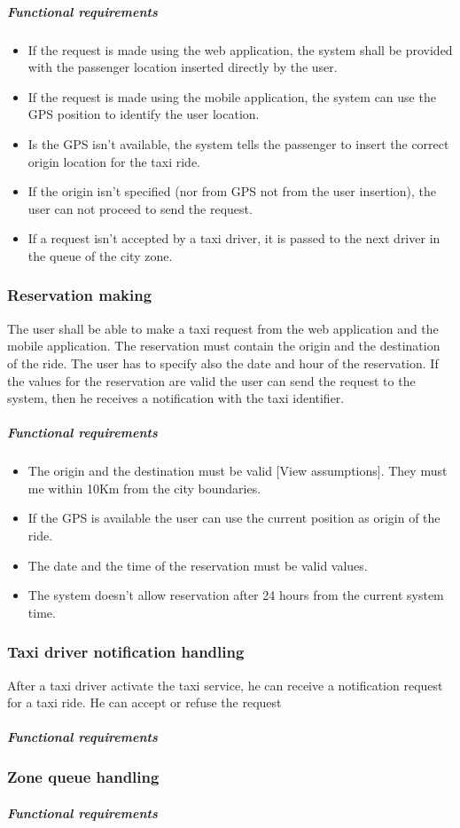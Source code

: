 	\subparagraph{Functional requirements}
	\noindent
		\begin{itemize}
			\item If the request is made using the web application, the system shall be provided with the passenger location inserted directly by the user.
			\item If the request is made using the mobile application, the system can use the GPS position to identify the user location.
			\item Is the GPS isn't available, the system tells the passenger to insert the correct origin location for the taxi ride.
			\item If the origin isn't specified (nor from GPS not from the user insertion), the user can not proceed to send the request.
			\item If a request isn't accepted by a taxi driver, it is passed to the next driver in the queue of the city zone.
		\end{itemize}


\subsubsection{Reservation making}
The user shall be able to make a taxi request from the web application and the mobile application. The reservation must contain the origin and the destination of the ride. The user has to specify also the date and hour of the reservation. If the values for the reservation are valid the user can send the request to the system, then he receives a notification with the taxi identifier.

	\subparagraph{Functional requirements}
	\noindent
		\begin{itemize}
			\item The origin and the destination must be valid [View assumptions]. They must me within 10Km from the city boundaries.
			\item If the GPS is available the user can use the current position as origin of the ride.
			\item The date and the time of the reservation must be valid values.
			\item The system doesn't allow reservation after 24 hours from the current system time.
		\end{itemize}


\subsubsection{Taxi driver notification handling}
After a taxi driver activate the taxi service, he can receive a notification request for a taxi ride. He can accept or refuse the request

	\subparagraph{Functional requirements}
	\noindent

\subsubsection{Zone queue handling}
	\subparagraph{Functional requirements}
	\noindent


